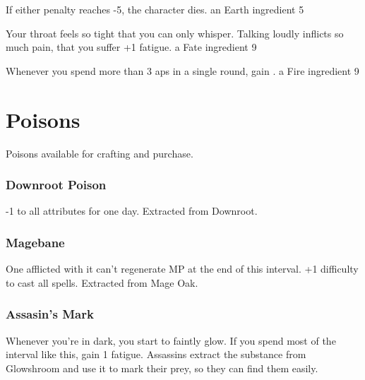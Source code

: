 \begin{multicols}{2}
{  If either penalty reaches -5, the character dies.
  }%
{an Earth \gls{ingredient}}%
{5}

%
  {Your throat feels so tight that you can only whisper.
  Talking loudly inflicts so much pain, that you suffer +1 \gls{fatigue}.
  }%
{a Fate \gls{ingredient}}%
{9}

%
  {Whenever you spend more than 3 \glspl{ap} in a single round, gain .
  }%
  {a Fire \gls{ingredient}}%
  {9}

\end{multicols}

\section{Poisons}

\begin{multicols}{2}

Poisons available for crafting and purchase.

\subsubsection{Downroot Poison}

-1 to all attributes for one day.
Extracted from Downroot.

\subsubsection{Magebane}

One afflicted with it can't regenerate MP at the end of this \gls{interval}.
+1 difficulty to cast all spells.
Extracted from Mage Oak.

\subsubsection{Assasin's Mark}

Whenever you're in dark, you start to faintly glow.
If you spend most of the \gls{interval} like this, gain 1 \gls{fatigue}.
Assassins extract the substance from Glowshroom and use it to mark their prey, so they can find them easily.

\end{multicols}
